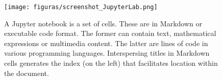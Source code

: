 \begin{figure}[!ht]
	\centering
	\texttt{[image: figuras/screenshot\_JupyterLab.png]}
	\caption{
		A Jupyter notebook is a set of cells.
		These are in Markdown or executable code format.
		The former can contain text, mathematical expressions or multimedia content.
		The latter are lines of code in various programming languages.
		Interspersing titles in Markdown cells generates the index (on the left) that facilitates location within the document.
	}
	\label{fig:jupyter}
\end{figure}







